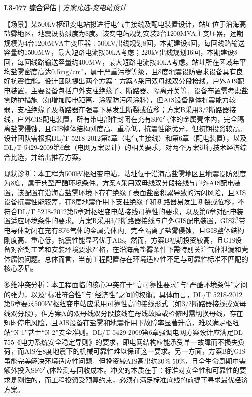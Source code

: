 \documentclass[11pt,a4paper]{ctexart}
\begin{document}
\noindent\textbf{L3-077} \hfill \textbf{综合评估} $|$ \textit{方案比选-变电站设计}
\begin{description}[leftmargin=1.5em,style=nextline,font=\normalfont]
  \item[Q:] 【场景】某500kV枢纽变电站拟进行电气主接线及配电装置设计，站址位于沿海高盐雾地区，地震设防烈度为8度。该变电站规划安装2台1200MVA主变压器，远期规模为4台1200MVA主变压器；500kV出线规划8回，本期建设4回，每回线路输送容量约1500MW，最大短路电流按50kA考虑；220kV出线规划16回，本期建设8回，每回线路输送容量约400MW，最大短路电流按40kA考虑。站址所在区域年平均盐雾密度高达0.5mg/cm²，属于严重污秽等级，且8度地震设防要求设备具有良好抗震性能。设计团队提出两个方案：方案A采用双母线双分段接线，户外AIS配电装置，主要设备包括户外支柱绝缘子、断路器、隔离开关等，设备布置需考虑盐雾防护措施（如增加爬电距离、涂覆防污闪涂料），但AIS设备整体抗震能力较弱，支柱绝缘子及断路器在强震下易发生断裂或位移；方案B采用3/2断路器接线，户外GIS配电装置，所有带电部件封闭在充有SF6气体的金属壳体内，完全隔离盐雾侵蚀，且GIS整体结构刚度高、重心低，抗震性能优异，但初期投资较高。设计团队需根据DL/T 5218-2012第5章（电气主接线）和第6章（配电装置），以及DL/T 5429-2009第6章（电网方案设计）的相关要求，对两个方案进行技术经济综合比选，并给出推荐方案。
  \item[A:] 现状诊断：本工程为500kV枢纽变电站，站址位于沿海高盐雾地区且地震设防烈度为8度，属于典型严酷环境条件。方案A采用双母线双分段接线与户外AIS配电装置，该配置在沿海高盐雾环境下存在绝缘子表面盐密积累导致的污闪风险，且AIS设备抗震性能较差，在8度地震作用下支柱绝缘子和断路器易发生断裂或位移，不符合DL/T 5218-2012第5章对枢纽变电站接线可靠性的要求，以及第6章对配电装置适应环境条件的要求。方案B采用3/2断路器接线与户外GIS配电装置，GIS将带电导体封闭在充有SF6气体的金属壳体内，完全隔离了盐雾侵蚀，且GIS整体结构刚度高、重心低，抗震性能显著优于AIS。然而，方案B初期投资较高，且GIS设备对密封工艺和安装环境要求严格，在沿海高盐雾条件下需特别关注气体泄漏和壳体腐蚀问题。总体而言，当前工程配置存在环境适应性不足与可靠性标准不匹配的核心矛盾。

多维冲突分析：本工程面临的核心冲突在于“高可靠性要求”与“严酷环境条件”之间的张力，以及“标准符合性”与“经济性”之间的权衡。具体而言，DL/T 5218-2012第5章要求500kV枢纽变电站应采用可靠性高的接线形式（如3/2断路器接线或双母线双分段），但方案A的双母线双分段接线在母线故障或检修时需切换母线，存在短时停电风险，且AIS设备在盐雾和地震作用下故障率显著升高，难以满足枢纽站“N-1”甚至“N-2”安全准则。DL/T 5429-2009第6章强调电网方案设计应满足DL 755《电力系统安全稳定导则》的要求，即电网结构应能承受单一故障而不损失负荷，而AIS在8度地震下的机械可靠性难以保证这一要求。另一方面，方案B的GIS虽能完美解决环境适应性问题，但投资较AIS高出约30\%-50\%，且全生命周期中需额外投入SF6气体监测与回收成本。冲突的本质在于：标准对安全性和可靠性的要求是刚性的，而工程投资受预算约束，必须在满足标准底线的前提下寻求最优经济方案。


\end{description}
\end{document}
